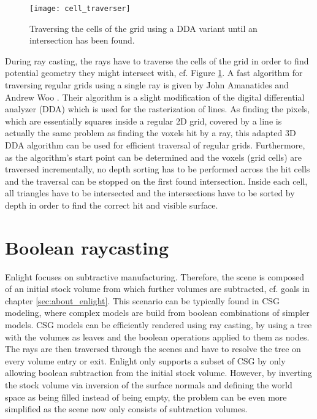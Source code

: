 \begin{figure}[h]
\centering
\texttt{[image: cell\_traverser]}
\caption{Traversing the cells of the grid using a DDA variant until an intersection has been found.}
\label{fig:cell_traverser}
\end{figure}

During ray casting, the rays have to traverse the cells of the grid in order to find potential geometry they might intersect with, cf. Figure \ref{fig:cell_traverser}. A fast algorithm for traversing regular grids using a single ray is given by John Amanatides and Andrew Woo \cite{3DDDA}. Their algorithm is a slight modification of the digital differential analyzer (DDA) which is used for the rasterization of lines. As finding the pixels, which are essentially squares inside a regular 2D grid, covered by a line is actually the same problem as finding the voxels hit by a ray, this adapted 3D DDA algorithm can be used for efficient traversal of regular grids. Furthermore, as the algorithm's start point can be determined and the voxels (grid cells) are traversed incrementally, no depth sorting has to be performed across the hit cells and the traversal can be stopped on the first found intersection. Inside each cell, all triangles have to be intersected and the intersections have to be sorted by depth in order to find the correct hit and visible surface.


\section{Boolean raycasting}
\label{sec:boolean_raycasting}

Enlight focuses on subtractive manufacturing. Therefore, the scene is composed of an initial stock volume from which further volumes are subtracted, cf. goals in chapter \ref{sec:about_enlight}. This scenario can be typically found in CSG modeling, where complex models are build from boolean combinations of simpler models. CSG models can be efficiently rendered using ray casting, by using a tree with the volumes as leaves and the boolean operations applied to them as nodes. The rays are then traversed through the scenes and have to resolve the tree on every volume entry or exit. Enlight only supports a subset of CSG by only allowing boolean subtraction from the initial stock volume. However, by inverting the stock volume via inversion of the surface normals and defining the world space as being filled instead of being empty, the problem can be even more simplified as the scene now only consists of subtraction volumes.

